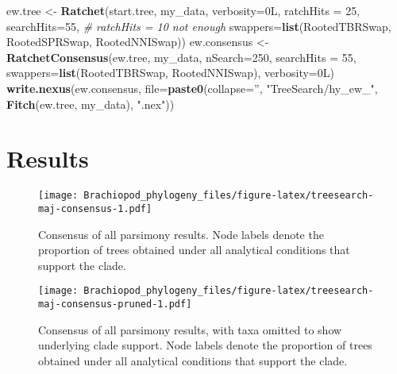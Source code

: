 \documentclass[openany]{book}
\newenvironment{Shaded}{\begin{snugshade}}{\end{snugshade}}
\newcommand{\KeywordTok}[1]{\textcolor[rgb]{0.13,0.29,0.53}{\textbf{#1}}}
\newcommand{\DataTypeTok}[1]{\textcolor[rgb]{0.13,0.29,0.53}{#1}}
\newcommand{\DecValTok}[1]{\textcolor[rgb]{0.00,0.00,0.81}{#1}}
\newcommand{\StringTok}[1]{\textcolor[rgb]{0.31,0.60,0.02}{#1}}
\newcommand{\CommentTok}[1]{\textcolor[rgb]{0.56,0.35,0.01}{\textit{#1}}}
\newcommand{\NormalTok}[1]{#1}
\theoremstyle{definition}
\theoremstyle{definition}
\theoremstyle{definition}
\theoremstyle{remark}
\begin{document}
\begin{Shaded}
\begin{Highlighting}[]
\NormalTok{ew.tree <-}\StringTok{ }\KeywordTok{Ratchet}\NormalTok{(start.tree, my_data, }\DataTypeTok{verbosity=}\NormalTok{0L,}
                   \DataTypeTok{ratchHits =} \DecValTok{25}\NormalTok{, }\DataTypeTok{searchHits=}\DecValTok{55}\NormalTok{, }\CommentTok{# ratchHits = 10 not enough}
                   \DataTypeTok{swappers=}\KeywordTok{list}\NormalTok{(RootedTBRSwap, RootedSPRSwap, RootedNNISwap))}
\NormalTok{ew.consensus <-}\StringTok{ }\KeywordTok{RatchetConsensus}\NormalTok{(ew.tree, my_data, }\DataTypeTok{nSearch=}\DecValTok{250}\NormalTok{, }\DataTypeTok{searchHits =} \DecValTok{55}\NormalTok{,}
                                 \DataTypeTok{swappers=}\KeywordTok{list}\NormalTok{(RootedTBRSwap, RootedNNISwap),}
                                 \DataTypeTok{verbosity=}\NormalTok{0L)}
\KeywordTok{write.nexus}\NormalTok{(ew.consensus, }\DataTypeTok{file=}\KeywordTok{paste0}\NormalTok{(}\DataTypeTok{collapse=}\StringTok{''}\NormalTok{, }\StringTok{"TreeSearch/hy_ew_"}\NormalTok{,}
                                      \KeywordTok{Fitch}\NormalTok{(ew.tree, my_data), }\StringTok{".nex"}\NormalTok{))}
\end{Highlighting}
\end{Shaded}

\section{Results}\label{results}






\begin{figure}
\centering
\texttt{[image: Brachiopod\_phylogeny\_files/figure-latex/treesearch-maj-consensus-1.pdf]}
\caption{\label{fig:treesearch-maj-consensus}Consensus of all parsimony results.
Node labels denote the proportion of trees obtained
under all analytical conditions that support the clade.}
\end{figure}




\begin{figure}
\centering
\texttt{[image: Brachiopod\_phylogeny\_files/figure-latex/treesearch-maj-consensus-pruned-1.pdf]}
\caption{\label{fig:treesearch-maj-consensus-pruned}Consensus of all parsimony results, with taxa omitted
to show underlying clade support.
Node labels denote the proportion of trees obtained
under all analytical conditions that support the clade.}
\end{figure}
\end{document}
